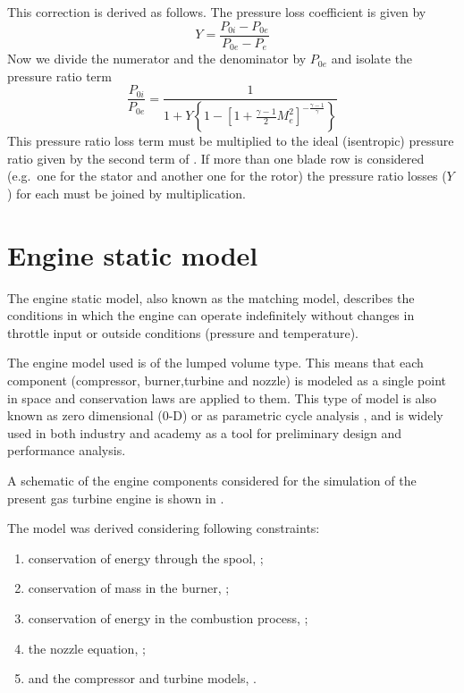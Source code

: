 This correction is derived as follows. The pressure loss coefficient is given by
\begin{equation}
    Y = \frac{P_{0i} - P_{0e}}{P_{0e} - P_e}
\end{equation}
Now we divide the numerator and the denominator by $P_{0e}$ and isolate the pressure ratio term 
\begin{equation}
    \frac{P_{0i}}{P_{0e}} = \frac{1}{1+Y\left\{1-\left[1+\tfrac{\gamma-1}{2}M_e^2\right]^{-\frac{\gamma-1}{\gamma}}\right\}}
\end{equation}
This pressure ratio loss term must be multiplied to the ideal (isentropic) pressure ratio given by the second term of . If more than one blade row is considered (e.g.\ one for the stator and another one for the rotor) the pressure ratio losses ($Y$) for each must be joined by multiplication.




\section{Engine static model}
\label{sec:model:static}

The engine static model, also known as the matching model, 
describes the conditions in which the engine can operate indefinitely 
without changes in throttle input or outside conditions (pressure and temperature).

The engine model used is of the lumped volume type. This means that each component 
 (compressor, burner,turbine and nozzle)
 is modeled as a single point in space and conservation laws are applied to them.
 This type of model is also known as zero dimensional (0-D) or as parametric cycle analysis
 ,
 and is widely used in both industry and academy as a tool for preliminary design and 
 performance analysis. 

A schematic of the engine components considered for the simulation of the present gas turbine engine is shown in .

The model was derived considering following constraints:

\begin{enumerate}
    \item conservation of energy through the spool, ;
    \item conservation of mass in the burner, ;
    \item conservation of energy in the combustion process, ;
    \item the nozzle equation, ;
    \item and the compressor and turbine models, .
\end{enumerate}

